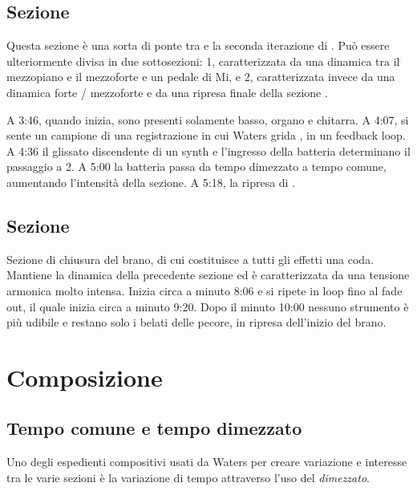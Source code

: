 \documentclass[class=book, crop=false, oneside, 12pt]{standalone}
\begin{document}
    \subsection{Sezione }
    Questa sezione è una sorta di ponte tra  e la seconda iterazione di . Può essere ulteriormente divisa in due sottosezioni: 1, caratterizzata da una dinamica tra il mezzopiano e il mezzoforte e un pedale di Mi, e 2, caratterizzata invece da una dinamica forte / mezzoforte e da una ripresa finale della sezione .

    A 3:46, quando inizia, sono presenti solamente basso, organo e chitarra. A 4:07, si sente un campione  di una registrazione in cui Waters grida , in un feedback loop. A 4:36 il glissato discendente di un synth e l'ingresso della batteria determinano il passaggio a 2. A 5:00 la batteria passa da tempo dimezzato a tempo comune, aumentando l'intensità della sezione. A 5:18, la ripresa di .

    
    \subsection{Sezione }
    Sezione di chiusura del brano, di cui costituisce a tutti gli effetti una coda. Mantiene la dinamica della precedente sezione ed è caratterizzata da una tensione armonica molto intensa. Inizia circa a minuto 8:06 e si ripete in loop fino al fade out, il quale inizia circa a minuto 9:20. Dopo il minuto 10:00 nessuno strumento è più udibile e restano solo i belati delle pecore, in ripresa dell'inizio del brano.
    
    \section{Composizione}
    \label{sec:04-arrangement}

    \subsection{Tempo comune e tempo dimezzato}
    Uno degli espedienti compositivi usati da Waters per creare variazione e interesse tra le varie sezioni è la variazione di tempo attraverso l'uso del \emph{dimezzato}. 
\end{document}
